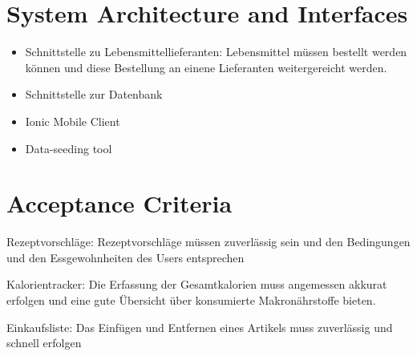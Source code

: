 \documentclass[12pt]{article}
\theoremstyle{definition}
\begin{document}
\pagebreak
\section{System Architecture and Interfaces}

\begin{itemize}
    \item Schnittstelle zu Lebensmittellieferanten: Lebensmittel müssen bestellt werden können und diese Bestellung an einene Lieferanten weitergereicht werden.
    \item Schnittstelle zur Datenbank
    \item Ionic Mobile Client
    \item Data-seeding tool
\end{itemize}



\pagebreak
\section{Acceptance Criteria} 
\noindent Rezeptvorschläge:
\indenDie Rezeptvorschläge müssen zuverlässig sein und den Bedingungen und den Essgewohnheiten des Users entsprechen

\noindent Kalorientracker:
Die Erfassung der Gesamtkalorien muss angemessen akkurat erfolgen und eine gute Übersicht über konsumierte Makronährstoffe bieten.

\noindent Einkaufsliste:
Das Einfügen und Entfernen eines Artikels muss zuverlässig und schnell erfolgen
\end{document}
